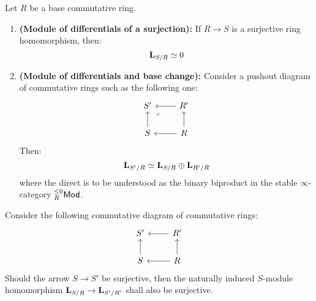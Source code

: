                 \begin{proposition} \label{prop: cotangent_complexes_and_finite_colimits}
                    Let $R$ be a base commutative ring. 
                        \begin{enumerate}
                            \item \textbf{(Module of differentials of a surjection):} If $R \to S$ is a surjective ring homomorphism, then:
                                $$\mathbf{L}_{S/R} \simeq 0$$
                            \item \textbf{(Module of differentials and base change):} Consider a pushout diagram of commutative rings such as the following one:
                                $$
                                    \begin{tikzcd}
                                    	{S'} & {R'} \\
                                    	S & R
                                    	\arrow[from=2-2, to=2-1]
                                    	\arrow[from=2-1, to=1-1]
                                    	\arrow[from=2-2, to=1-2]
                                    	\arrow[from=1-2, to=1-1]
                                    	\arrow["\lrcorner"{anchor=center, pos=0.125}, draw=none, from=1-1, to=2-2]
                                    \end{tikzcd}
                                $$
                            Then:
                                $$\mathbf{L}_{S'/R} \simeq \mathbf{L}_{S/R} \oplus \mathbf{L}_{R'/R}$$
                            where the direct is to be understood as the binary biproduct in the stable $\infty$-category ${}_R^{\leq 0}\mathsf{Mod}$.
                        \end{enumerate}
                \end{proposition}
                    
                \begin{lemma} \label{lemma: surjections_between_cotangent_complexes}
                    Consider the following commutative diagram of commutative rings:
                        $$
                            \begin{tikzcd}
                            	{S'} & {R'} \\
                            	S & R
                            	\arrow[from=2-1, to=1-1]
                            	\arrow[from=2-2, to=1-2]
                            	\arrow[from=1-2, to=1-1]
                            	\arrow[from=2-2, to=2-1]
                            \end{tikzcd}
                        $$
                    Should the arrow $S \to S'$ be surjective, then the naturally induced $S$-module homomorphism $\mathbf{L}_{S/R} \to \mathbf{L}_{S'/R'}$ shall also be surjective.
                \end{lemma}
                    
